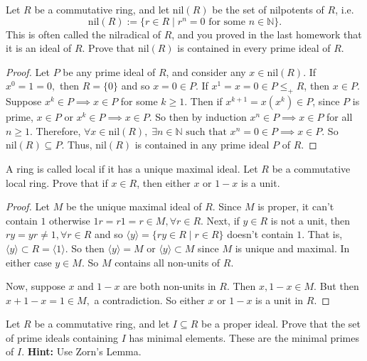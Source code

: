 \documentclass[addpoints,10pt]{exam}
\theoremstyle{plain}
\theoremstyle{definition}
\newtheorem{prob}[thm]{Problem}
\theoremstyle{plain}
\theoremstyle{plain}
\theoremstyle{definition}
\let\oldprob\prob
\let\endoldprob\endprob
\renewenvironment{prob}
  {\begin{singlespace}\oldprob}
  {\endoldprob\end{singlespace}}
\newcommand{\NN}{\ensuremath{\mathbb{N}}}
\newcommand{\tbf}[1]{\textbf{ #1 }}
\newcommand{\nil}{\ensuremath{\mathrm{nil}}}
\begin{document}
\begin{prob}
Let $R$ be a commutative ring, and let $\nil(R)$ be the set of nilpotents of $R$, i.e.
\[
\nil(R) := \{r \in R \mid r^n = 0 \text{ for some } n \in \NN\}.
\]
This is often called the nilradical of $R$, and you proved in the last homework that it is an ideal of $R$. Prove that $\nil(R)$ is contained in every prime ideal of $R$.
\end{prob}
\begin{proof}
Let $P$ be any prime ideal of $R$, and consider any $x\in \nil(R).$ If $x^{0}=1=0,$ then $R=\{0\}$ and so $x=0\in P$. If $x^{1}=x=0\in P\leq_{+}R$, then $x\in P$. Suppose $x^{k}\in P\implies x\in P$ for some $k\geq 1$. Then if $x^{k+1}=x(x^{k})\in P$, since $P$ is prime, $x\in P$ or $x^{k}\in P\implies x\in P$. So then by induction $x^{n}\in P\implies x\in P$ for all $n\geq 1$. Therefore, $\forall x\in \nil(R),\;\exists n\in \NN\text{ such that }x^{n}=0\in P\implies x\in P$. So $\nil(R)\subseteq P$. Thus, $\nil(R)$ is contained in any prime ideal $P$ of $R$.

\end{proof}
\newpage
\begin{prob}
A ring is called local if it has a unique maximal ideal. Let $R$ be a commutative local ring. Prove that if $x \in R$, then either $x$ or $1-x$ is a unit.
\end{prob}

\begin{proof}
Let $M$ be the unique maximal ideal of $R$. Since $M$ is proper, it can't contain $1$ otherwise $1r=r1=r\in M,\forall r\in R$. Next, if $y\in R$ is not a unit, then $ry=yr\neq 1,\forall r\in R$ and so $\langle y\rangle=\{ry\in R\mid r\in R\}$ doesn't contain $1$. That is, $\langle y\rangle \subset R=\langle 1 \rangle$. So then $\langle y \rangle =M$ or $\langle y\rangle \subset M$ since $M$ is unique and maximal. In either case $y\in M$. So $M$ contains all non-units of $R$. 

Now, suppose $x$ and $1-x$ are both non-units in $R$. Then $x,1-x\in M$. But then $x+1-x=1\in M,$ a contradiction. So either $x$ or $1-x$ is a unit in $R$.
\end{proof}

\begin{prob}
Let $R$ be a commutative ring, and let $I \subseteq R$ be a proper ideal. Prove that the set of prime ideals containing $I$ has minimal elements. These are the minimal primes of $I$. \tbf{Hint:} Use Zorn's Lemma.
\end{prob}
\end{document}
